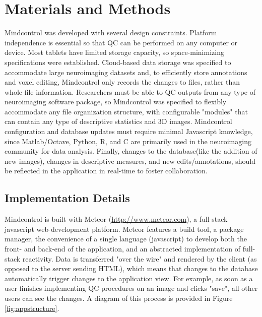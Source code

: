 \section{Materials and Methods}

Mindcontrol was developed with several design constraints. Platform independence is essential so that QC can be performed on any computer or device. Most tablets have limited storage capacity, so space-minimizing specifications were established. Cloud-based data storage was specified to accommodate large neuroimaging datasets and, to efficiently store annotations and voxel editing, Mindcontrol only records the changes to files, rather than whole-file information. Researchers must be able to QC outputs from any type of neuroimaging software package, so Mindcontrol was specified to flexibly accommodate any file organization structure, with configurable "modules" that can contain any type of descriptive statistics and 3D images. Mindcontrol configuration and database updates must require minimal Javascript knowledge, since Matlab/Octave, Python, R, and C are primarily used in the neuroimaging community for data analysis. Finally, changes to the database(like the addition of new images), changes in descriptive measures, and new edits/annotations, should be reflected in the application in real-time to foster collaboration.  


\subsection{Implementation Details}

Mindcontrol is built with Meteor (\href{http://www.meteor.com}{http://www.meteor.com}), a full-stack javascript web-development platform. Meteor features a build tool, a package manager, the convenience of a single language (javascript) to develop both the front- and back-end of the application, and an abstracted implementation of full-stack reactivity. Data is transferred "over the wire" and rendered by the client (as opposed to the server sending HTML), which means that changes to the database automatically trigger changes to the application view. For example, as soon as a user finishes implementing QC procedures on an image and clicks "save", all other users can see the changes. A diagram of this process is provided in Figure \ref{fig:appstructure}.



